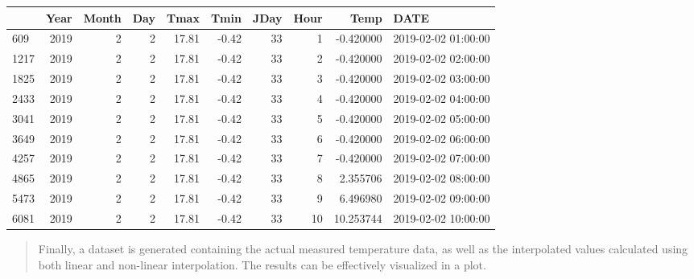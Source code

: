 \documentclass[
]{book}
\begin{document}
\begin{tabular}{l|r|r|r|r|r|r|r|r|l}
\hline
  & Year & Month & Day & Tmax & Tmin & JDay & Hour & Temp & DATE\\
\hline
609 & 2019 & 2 & 2 & 17.81 & -0.42 & 33 & 1 & -0.420000 & 2019-02-02 01:00:00\\
\hline
1217 & 2019 & 2 & 2 & 17.81 & -0.42 & 33 & 2 & -0.420000 & 2019-02-02 02:00:00\\
\hline
1825 & 2019 & 2 & 2 & 17.81 & -0.42 & 33 & 3 & -0.420000 & 2019-02-02 03:00:00\\
\hline
2433 & 2019 & 2 & 2 & 17.81 & -0.42 & 33 & 4 & -0.420000 & 2019-02-02 04:00:00\\
\hline
3041 & 2019 & 2 & 2 & 17.81 & -0.42 & 33 & 5 & -0.420000 & 2019-02-02 05:00:00\\
\hline
3649 & 2019 & 2 & 2 & 17.81 & -0.42 & 33 & 6 & -0.420000 & 2019-02-02 06:00:00\\
\hline
4257 & 2019 & 2 & 2 & 17.81 & -0.42 & 33 & 7 & -0.420000 & 2019-02-02 07:00:00\\
\hline
4865 & 2019 & 2 & 2 & 17.81 & -0.42 & 33 & 8 & 2.355706 & 2019-02-02 08:00:00\\
\hline
5473 & 2019 & 2 & 2 & 17.81 & -0.42 & 33 & 9 & 6.496980 & 2019-02-02 09:00:00\\
\hline
6081 & 2019 & 2 & 2 & 17.81 & -0.42 & 33 & 10 & 10.253744 & 2019-02-02 10:00:00\\
\hline
\end{tabular}
\endgroup{}

\begin{quote}
Finally, a dataset is generated containing the actual measured temperature data, as well as the interpolated values calculated using both linear and non-linear interpolation. The results can be effectively visualized in a plot.
\end{quote}
\end{document}
